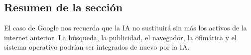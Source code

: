 \subsection{Resumen de la sección}

El caso de Google nos recuerda que la IA no sustituirá sin más los activos de la internet anterior. La búsqueda, la publicidad, el navegador, la ofimática y el sistema operativo podrían ser integrados de nuevo por la IA.
